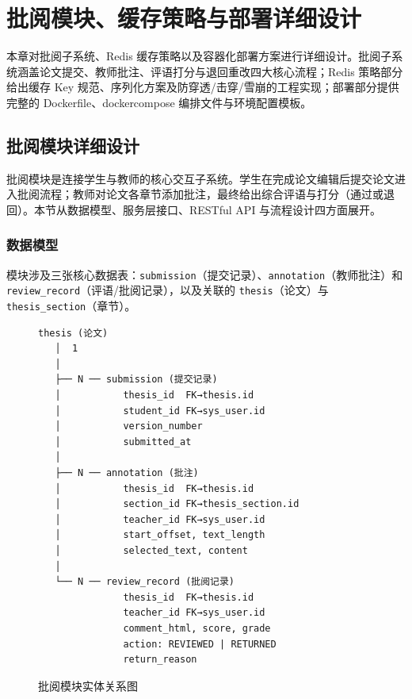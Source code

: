 
\section{批阅模块、缓存策略与部署详细设计}

本章对批阅子系统、Redis 缓存策略以及容器化部署方案进行详细设计。批阅子系统涵盖论文提交、教师批注、评语打分与退回重改四大核心流程；Redis 策略部分给出缓存 Key 规范、序列化方案及防穿透/击穿/雪崩的工程实现；部署部分提供完整的 Dockerfile、docker\-compose 编排文件与环境配置模板。

\subsection{批阅模块详细设计}

批阅模块是连接学生与教师的核心交互子系统。学生在完成论文编辑后提交论文进入批阅流程；教师对论文各章节添加批注，最终给出综合评语与打分（通过或退回）。本节从数据模型、服务层接口、RESTful API 与流程设计四方面展开。

\subsubsection{数据模型}

模块涉及三张核心数据表：\texttt{submission}（提交记录）、\texttt{annotation}（教师批注）和 \texttt{review\_record}（评语/批阅记录），以及关联的 \texttt{thesis}（论文）与 \texttt{thesis\_section}（章节）。

\begin{figure}[htbp]
\centering
\begin{verbatim}
thesis (论文)
   │  1
   │
   ├── N ── submission (提交记录)
   │           thesis_id  FK→thesis.id
   │           student_id FK→sys_user.id
   │           version_number
   │           submitted_at
   │
   ├── N ── annotation (批注)
   │           thesis_id  FK→thesis.id
   │           section_id FK→thesis_section.id
   │           teacher_id FK→sys_user.id
   │           start_offset, text_length
   │           selected_text, content
   │
   └── N ── review_record (批阅记录)
               thesis_id  FK→thesis.id
               teacher_id FK→sys_user.id
               comment_html, score, grade
               action: REVIEWED | RETURNED
               return_reason
\end{verbatim}
\caption{批阅模块实体关系图}
\label{fig:review-er}
\end{figure}

